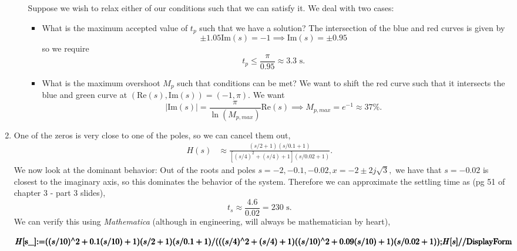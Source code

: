 \documentclass{article}
\numberwithin{equation}{section}
\begin{document}
\begin{enumerate}[label=\textbf{1.\arabic*}]
\begin{enumerate}[label=(\alph*)]
        Suppose we wish to relax either of our conditions such that we can satisfy it. We deal with two cases:
        \begin{itemize}
            \item What is the maximum accepted value of $t_p$ such that we have a solution? The intersection of the blue and red curves is given by 
            \begin{equation}
                \pm 1.05 \text{Im}(s) = -1 \implies \text{Im}(s) = \pm 0.95 
            \end{equation}
            so we require 
            \begin{equation}
                t_p \le \frac{\pi}{0.95} \approx 3.3\text{ s}.
            \end{equation}
            \item What is the maximum overshoot $M_p$ such that conditions can be met? We want to shift the red curve such that it intersects the blue and green curve at $(\text{Re}(s),\text{Im}(s)) = (-1,\pi).$ We want 
            \begin{equation}
            |\text{Im}(s)| = \frac{\pi}{\ln(M_{p,max})}\text{Re}(s) \implies M_{p,max} = e^{-1} \approx 37\%.
            \end{equation}
        \end{itemize}
    \end{enumerate}
    \item One of the zeros is very close to one of the poles, so we can cancel them out, 
    \begin{align}
        H(s) &\approx \frac{(s/2+1)(s/0.1+1)}{[(s/4)^2+(s/4)+1](s/0.02+1)}.
    \end{align}
    We now look at the dominant behavior: Out of the roots and poles $s=-2,-0.1,-0.02, x=-2 \pm 2j\sqrt{3},$ we have that $s=-0.02$ is closest to the imaginary axis, so this dominates the behavior of the system. Therefore we can approximate the settling time as (pg 51 of chapter 3 - part 3 slides),
    \begin{equation}
        t_s \approx \frac{4.6}{0.02} = 230\text{ s}.
    \end{equation}
    We can verify this using \textit{Mathematica} (although in engineering, will always be mathematician by heart),

    \begin{doublespace}
        \noindent\(\pmb{H[\text{s$\_$}]\text{:=}((s/10){}^{\wedge}2+0.1(s/10)+1)(s/2+1)(s/0.1+1)/(((s/4){}^{\wedge}2+(s/4)+1)((s/10){}^{\wedge}2+0.09(s/10)+1)(s/0.02+1));}\\
        \pmb{H[s]\text{//}\text{DisplayForm}}\)
        \end{doublespace}
        

\end{enumerate}
\end{document}
